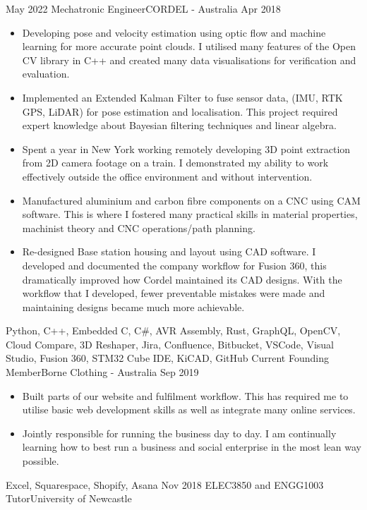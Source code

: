 \begin{experiences}
\emptySeparator
	\experience
		{May 2022}	{Mechatronic Engineer}{CORDEL - Australia}
		{Apr 2018}	{
			\begin{itemize}
				\item Developing pose and velocity estimation using optic flow and machine learning for more accurate point clouds. I utilised many features of the Open CV library in C++ and created many data visualisations for verification and evaluation.
				\item Implemented an Extended Kalman Filter to fuse sensor data, (IMU, RTK GPS, LiDAR) for pose estimation and localisation. This project required expert knowledge about Bayesian filtering techniques and linear algebra.
				\item Spent a year in New York working remotely developing 3D point extraction from 2D camera footage on a train. I demonstrated my ability to work effectively outside the office environment and without intervention.
				\item Manufactured aluminium and carbon fibre components on a CNC using CAM software. This is where I fostered many practical skills in material properties, machinist theory and CNC operations/path planning.
				\item Re-designed Base station housing and layout using CAD software. I developed and documented the company workflow for Fusion 360, this dramatically improved how Cordel maintained its CAD designs. With the workflow that I developed, fewer preventable mistakes were made and maintaining designs became much more achievable.
			\end{itemize}
		}
		{Python, C++, Embedded C, C\#, AVR Assembly, Rust, GraphQL, OpenCV, Cloud Compare, 3D Reshaper, Jira, Confluence, Bitbucket, VSCode, Visual Studio, Fusion 360, STM32 Cube IDE, KiCAD, GitHub}
	\emptySeparator
	\experience
		{Current}	{Founding Member}{Borne Clothing - Australia}
		{Sep 2019}	{
			\begin{itemize}
				\item Built parts of our website and fulfilment workflow. This has required me to utilise basic web development skills as well as integrate many online services.
				\item Jointly responsible for running the business day to day. I am continually learning how to best run a business and social enterprise in the most lean way possible.
			\end{itemize}
		}
		{Excel, Squarespace, Shopify, Asana}
	\emptySeparator
	\experience
		{Nov 2018}	{ELEC3850 and ENGG1003 Tutor}{University of Newcastle}

\end{experiences}
